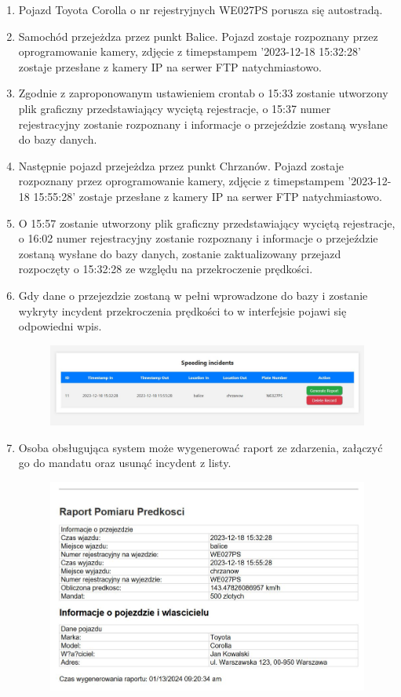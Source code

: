 \documentclass[12pt,a4paper,oneside]{article}
\theoremstyle{definition}
\numberwithin{equation}{section}
\begin{document}
\begin{enumerate}
  \item Pojazd Toyota Corolla o nr rejestryjnych WE027PS porusza się autostradą.
  \item Samochód przejeżdza przez punkt Balice. Pojazd zostaje rozpoznany przez oprogramowanie kamery, zdjęcie z timepstampem '2023-12-18 15:32:28' zostaje przesłane z kamery IP na serwer FTP natychmiastowo. 
  \item Zgodnie z zaproponowanym ustawieniem crontab o 15:33 zostanie utworzony plik graficzny przedstawiający wyciętą rejestracje, o 15:37 numer rejestracyjny zostanie rozpoznany i informacje o przejeździe zostaną wysłane do bazy danych. 
  \item Następnie pojazd przejeżdza przez punkt Chrzanów. Pojazd zostaje rozpoznany przez oprogramowanie kamery, zdjęcie z timepstampem '2023-12-18 15:55:28' zostaje przesłane z kamery IP na serwer FTP natychmiastowo. 
  \item O 15:57 zostanie utworzony plik graficzny przedstawiający wyciętą rejestracje, o 16:02 numer rejestracyjny zostanie rozpoznany i informacje o przejeździe zostaną wysłane do bazy danych, zostanie zaktualizowany przejazd rozpoczęty o 15:32:28 ze względu na przekroczenie prędkości.
  \item Gdy dane o przejezdzie zostaną w pełni wprowadzone do bazy i zostanie wykryty incydent przekroczenia prędkości to w interfejsie pojawi się odpowiedni wpis. 
        \begin{figure}[H]
          \includegraphics[width=\linewidth]{dokumentacja_uzytkowa/images/delete_2.JPG}
          \label{fig:Generowanie}
        \end{figure}    
  \item Osoba obsługująca system może wygenerować raport ze zdarzenia, załączyć go do mandatu oraz usunąć incydent z listy. 
        \begin{figure}[H]
          \includegraphics[width=\linewidth]{dokumentacja_uzytkowa/images/report.JPG}

\end{figure}
\end{enumerate}
\end{document}
